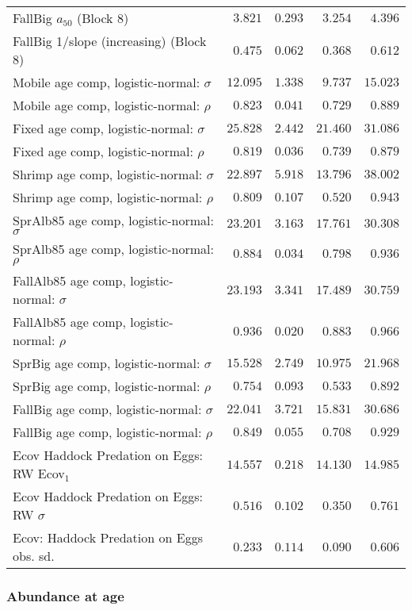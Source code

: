 \documentclass[
]{article}
\begin{document}
\begin{landscape}
\begin{longtable}[t]{lrrrr}
\addlinespace
FallBig $a_{50}$ (Block 8) & $3.821$ & $0.293$ & $3.254$ & $4.396$\\
FallBig 1/slope (increasing) (Block 8) & $0.475$ & $0.062$ & $0.368$ & $0.612$\\
Mobile age comp, logistic-normal: $\sigma$ & $12.095$ & $1.338$ & $9.737$ & $15.023$\\
Mobile age comp, logistic-normal: $\rho$ & $0.823$ & $0.041$ & $0.729$ & $0.889$\\
Fixed age comp, logistic-normal: $\sigma$ & $25.828$ & $2.442$ & $21.460$ & $31.086$\\
\addlinespace
Fixed age comp, logistic-normal: $\rho$ & $0.819$ & $0.036$ & $0.739$ & $0.879$\\
Shrimp age comp, logistic-normal: $\sigma$ & $22.897$ & $5.918$ & $13.796$ & $38.002$\\
Shrimp age comp, logistic-normal: $\rho$ & $0.809$ & $0.107$ & $0.520$ & $0.943$\\
SprAlb85 age comp, logistic-normal: $\sigma$ & $23.201$ & $3.163$ & $17.761$ & $30.308$\\
SprAlb85 age comp, logistic-normal: $\rho$ & $0.884$ & $0.034$ & $0.798$ & $0.936$\\
\addlinespace
FallAlb85 age comp, logistic-normal: $\sigma$ & $23.193$ & $3.341$ & $17.489$ & $30.759$\\
FallAlb85 age comp, logistic-normal: $\rho$ & $0.936$ & $0.020$ & $0.883$ & $0.966$\\
SprBig age comp, logistic-normal: $\sigma$ & $15.528$ & $2.749$ & $10.975$ & $21.968$\\
SprBig age comp, logistic-normal: $\rho$ & $0.754$ & $0.093$ & $0.533$ & $0.892$\\
FallBig age comp, logistic-normal: $\sigma$ & $22.041$ & $3.721$ & $15.831$ & $30.686$\\
\addlinespace
FallBig age comp, logistic-normal: $\rho$ & $0.849$ & $0.055$ & $0.708$ & $0.929$\\
Ecov Haddock Predation on Eggs: RW Ecov$_1$ & $14.557$ & $0.218$ & $14.130$ & $14.985$\\
Ecov Haddock Predation on Eggs: RW $\sigma$ & $0.516$ & $0.102$ & $0.350$ & $0.761$\\
Ecov: Haddock Predation on Eggs obs. sd. & $0.233$ & $0.114$ & $0.090$ & $0.606$\\*
\end{longtable}
\end{landscape}

\subsubsection{Abundance at age}\label{abundance-at-age}
\end{document}
